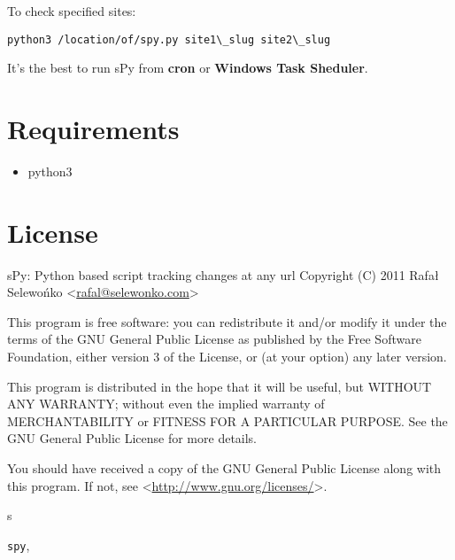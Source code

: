 \documentclass[letterpaper,10pt,english]{sphinxmanual}
\begin{document}
To check specified sites:

\begin{Verbatim}[commandchars=\\\{\}]
python3 /location/of/spy.py site1\_slug site2\_slug
\end{Verbatim}

It's the best to run sPy from \textbf{cron} or \textbf{Windows Task Sheduler}.


\chapter{Requirements}
\label{index:requirements}\begin{itemize}
\item {} 
python3

\end{itemize}


\chapter{License}
\label{index:license}
sPy: Python based script tracking changes at any url
Copyright (C) 2011  Rafał Selewońko \textless{}\href{mailto:rafal@selewonko.com}{rafal@selewonko.com}\textgreater{}

This program is free software: you can redistribute it and/or modify
it under the terms of the GNU General Public License as published by
the Free Software Foundation, either version 3 of the License, or
(at your option) any later version.

This program is distributed in the hope that it will be useful,
but WITHOUT ANY WARRANTY; without even the implied warranty of
MERCHANTABILITY or FITNESS FOR A PARTICULAR PURPOSE.  See the
GNU General Public License for more details.

You should have received a copy of the GNU General Public License
along with this program.  If not, see \textless{}\href{http://www.gnu.org/licenses/}{http://www.gnu.org/licenses/}\textgreater{}.


\renewcommand{\indexname}{Python Module Index}
\begin{theindex}
\def\bigletter#1{{\Large\sffamily#1}\nopagebreak\vspace{1mm}}
\bigletter{s}
\item {\texttt{spy}}, \pageref{index:module-spy}
\end{theindex}

\renewcommand{\indexname}{Index}
\printindex
\end{document}
